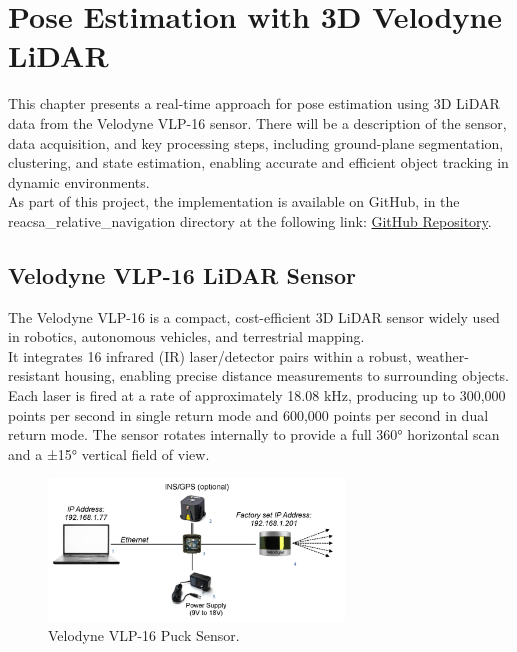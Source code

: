 \chapter{Pose Estimation with 3D Velodyne LiDAR}

This chapter presents a real-time approach for pose estimation using 3D LiDAR data from the Velodyne VLP-16 sensor. 
There will be a description of the sensor, data acquisition, and key processing steps, including ground-plane segmentation, clustering, and state estimation, 
enabling accurate and efficient object tracking in dynamic environments. \\

As part of this project, the implementation is available on GitHub, in the reacsa\_relative\_navigation directory at the following link: 
\href{https://github.com/francy2001/relative_navigation.git}{GitHub Repository}.

\section{Velodyne VLP-16 LiDAR Sensor}

The Velodyne VLP-16 is a compact, cost-efficient 3D LiDAR sensor widely used in robotics, autonomous vehicles, and terrestrial mapping. \\
It integrates 16 infrared (IR) laser/detector pairs within a robust, weather-resistant housing, enabling precise distance measurements to surrounding objects. 
Each laser is fired at a rate of approximately 18.08 kHz, producing up to 300,000 points per second in single return mode and 600,000 points per second in dual return mode. 
The sensor rotates internally to provide a full 360° horizontal scan and a ±15° vertical field of view.

\begin{figure}[H]
    \centering
    \includegraphics[width=0.7\textwidth]{figs/VELODYNE_1.png}
    \caption{Velodyne VLP-16 Puck Sensor.}
    \label{fig:3DSensingSystem}
\end{figure}

